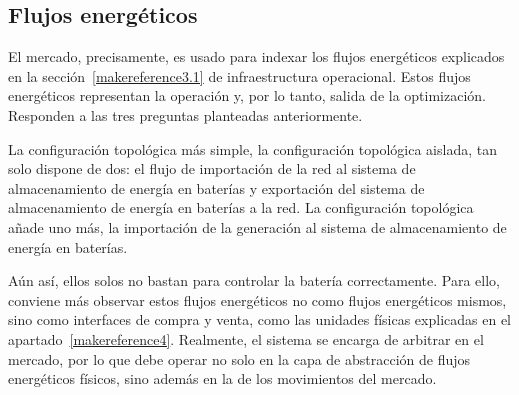 \begin{table}[ht]
  \centering
  \caption[Ajustes del mercado intradiario en cambios de hora de invierno.]{Ajustes del mercado intradiario en cambios de hora de invierno.}
  \label{tab:cambio-hora-invierno}
\end{table}

\subsection{Flujos energéticos}
\label{makereference5.1.2}

El mercado, precisamente, es usado para indexar los flujos energéticos explicados en la sección~\ref{makereference3.1} de infraestructura operacional. Estos flujos energéticos representan la operación y, por lo tanto, salida de la optimización. Responden a las tres preguntas planteadas anteriormente.

La configuración topológica más simple, la configuración topológica aislada, tan solo dispone de dos: el flujo de importación de la red al sistema de almacenamiento de energía en baterías y exportación del sistema de almacenamiento de energía en baterías a la red. La configuración topológica añade uno más, la importación de la generación al sistema de almacenamiento de energía en baterías.

Aún así, ellos solos no bastan para controlar la batería correctamente. Para ello, conviene más observar estos flujos energéticos no como flujos energéticos mismos, sino como interfaces de compra y venta, como las unidades físicas explicadas en el apartado~\ref{makereference4}. Realmente, el sistema se encarga de arbitrar en el mercado, por lo que debe operar no solo en la capa de abstracción de flujos energéticos físicos, sino además en la de los movimientos del mercado.

